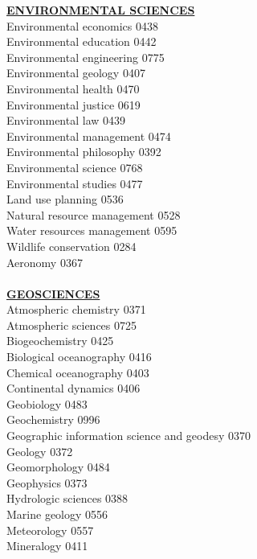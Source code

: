 \documentclass[9pt,twoside]{article}
\newcommand{\categoryheading}[1]{{\fontsize{8}{11}\selectfont \textbf{\uline{#1}}}}
\begin{document}
\begin{multicols}{3}
\categoryheading{ENVIRONMENTAL SCIENCES} \\
Environmental economics \hfill 0438 \\
Environmental education \hfill 0442 \\
Environmental engineering \hfill 0775 \\
Environmental geology \hfill 0407 \\
Environmental health \hfill 0470 \\
Environmental justice \hfill 0619 \\
Environmental law \hfill 0439 \\
Environmental management \hfill 0474 \\
Environmental philosophy \hfill 0392 \\
Environmental science \hfill 0768 \\
Environmental studies \hfill 0477 \\
Land use planning \hfill 0536 \\
Natural resource management \hfill 0528 \\
Water resources management \hfill 0595 \\
Wildlife conservation \hfill 0284 \\
Aeronomy \hfill 0367 \\
\columnbreak \\
\categoryheading{GEOSCIENCES} \\
Atmospheric chemistry \hfill 0371 \\
Atmospheric sciences \hfill 0725 \\
Biogeochemistry \hfill 0425 \\
Biological oceanography \hfill 0416 \\
Chemical oceanography \hfill 0403 \\
Continental dynamics \hfill 0406 \\
Geobiology \hfill 0483 \\
Geochemistry \hfill 0996 \\
Geographic information science
and geodesy \hfill 0370 \\
Geology \hfill 0372 \\
Geomorphology \hfill 0484 \\
Geophysics \hfill 0373 \\
Hydrologic sciences \hfill 0388 \\
Marine geology \hfill 0556 \\
Meteorology \hfill 0557 \\
Mineralogy \hfill 0411 \\

\end{multicols}
\end{document}
